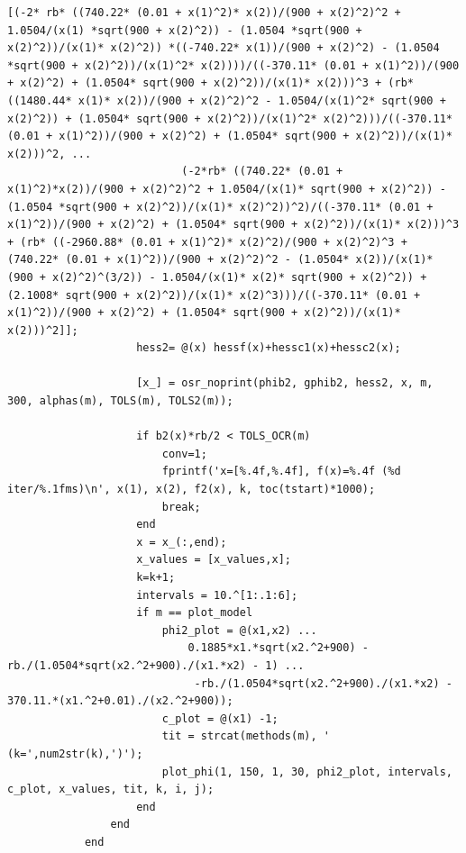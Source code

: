 \documentclass[10pt, a4paper]{article}
\begin{document}
\begin{minipage}{\linewidth}
\begin{lstlisting}[style=myStyle, caption= trecho de c\'odigo do problema 02 (barreira) (2/2), label=list_p02_bar_2]
                          [(-2* rb* ((740.22* (0.01 + x(1)^2)* x(2))/(900 + x(2)^2)^2 + 1.0504/(x(1) *sqrt(900 + x(2)^2)) - (1.0504 *sqrt(900 + x(2)^2))/(x(1)* x(2)^2)) *((-740.22* x(1))/(900 + x(2)^2) - (1.0504 *sqrt(900 + x(2)^2))/(x(1)^2* x(2))))/((-370.11* (0.01 + x(1)^2))/(900 + x(2)^2) + (1.0504* sqrt(900 + x(2)^2))/(x(1)* x(2)))^3 + (rb* ((1480.44* x(1)* x(2))/(900 + x(2)^2)^2 - 1.0504/(x(1)^2* sqrt(900 + x(2)^2)) + (1.0504* sqrt(900 + x(2)^2))/(x(1)^2* x(2)^2)))/((-370.11* (0.01 + x(1)^2))/(900 + x(2)^2) + (1.0504* sqrt(900 + x(2)^2))/(x(1)* x(2)))^2, ...
                           (-2*rb* ((740.22* (0.01 + x(1)^2)*x(2))/(900 + x(2)^2)^2 + 1.0504/(x(1)* sqrt(900 + x(2)^2)) - (1.0504 *sqrt(900 + x(2)^2))/(x(1)* x(2)^2))^2)/((-370.11* (0.01 + x(1)^2))/(900 + x(2)^2) + (1.0504* sqrt(900 + x(2)^2))/(x(1)* x(2)))^3 + (rb* ((-2960.88* (0.01 + x(1)^2)* x(2)^2)/(900 + x(2)^2)^3 + (740.22* (0.01 + x(1)^2))/(900 + x(2)^2)^2 - (1.0504* x(2))/(x(1)* (900 + x(2)^2)^(3/2)) - 1.0504/(x(1)* x(2)* sqrt(900 + x(2)^2)) + (2.1008* sqrt(900 + x(2)^2))/(x(1)* x(2)^3)))/((-370.11* (0.01 + x(1)^2))/(900 + x(2)^2) + (1.0504* sqrt(900 + x(2)^2))/(x(1)* x(2)))^2]];
                    hess2= @(x) hessf(x)+hessc1(x)+hessc2(x);

                    [x_] = osr_noprint(phib2, gphib2, hess2, x, m, 300, alphas(m), TOLS(m), TOLS2(m));

                    if b2(x)*rb/2 < TOLS_OCR(m)
                        conv=1;
                        fprintf('x=[%.4f,%.4f], f(x)=%.4f (%d iter/%.1fms)\n', x(1), x(2), f2(x), k, toc(tstart)*1000);
                        break;
                    end
                    x = x_(:,end);
                    x_values = [x_values,x];
                    k=k+1;
                    intervals = 10.^[1:.1:6];
                    if m == plot_model
                        phi2_plot = @(x1,x2) ...
                            0.1885*x1.*sqrt(x2.^2+900) -rb./(1.0504*sqrt(x2.^2+900)./(x1.*x2) - 1) ...
                             -rb./(1.0504*sqrt(x2.^2+900)./(x1.*x2) - 370.11.*(x1.^2+0.01)./(x2.^2+900));
                        c_plot = @(x1) -1;
                        tit = strcat(methods(m), ' (k=',num2str(k),')');
                        plot_phi(1, 150, 1, 30, phi2_plot, intervals, c_plot, x_values, tit, k, i, j);
                    end
                end
            end
      \end{lstlisting}
\end{minipage}
\end{document}

